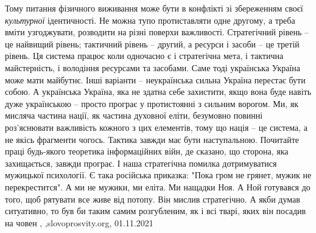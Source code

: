 Тому питання фізичного виживання може бути в конфлікті зі збереженням своєї
\emph{культурної} ідентичності. Не можна тупо протиставляти одне другому, а треба
вміти узгоджувати, розводити на різні поверхи важливості. Стратегічний рівень –
це найвищий рівень; тактичний рівень – другий, а ресурси і засоби – це третій
рівень. Ця система працює коли одночасно є і стратегічна мета, і тактична
майстерність, і володіння ресурсами та засобами. Саме тоді українська Україна
може мати майбутнє.  Інші варіанти – неукраїнська сильна Україна перестає бути
собою. А українська Україна, яка не здатна себе захистити, якщо вона буде
навіть дуже українською – просто програє у протистоянні з сильним ворогом.  Ми,
як мисляча частина нації, як частина духовної еліти, безумовно повинні
роз’яснювати важливість кожного з цих елементів, тому що нація – це система, а
не якісь фрагменти чогось.  Тактика завжди має бути наступальною. Почитайте
праці будь-якого теоретика інформаційних війн, де сказано, що сторона, яка
захищається, завжди програє. І наша стратегічна помилка дотримуватися мужицької
психології. Є така російська приказка: "Пока гром не грянет, мужик не
перекрестится". А ми не мужики, ми еліта. Ми нащадки Ноя. А Ной готувався до
того, щоб рятувати все живе від потопу. Він мислив стратегічно. А якби думав
ситуативно, то був би таким самим розгубленим, як і всі тварі, яких він посадив
на човен
, ,slovoprosvity.org, 01.11.2021


